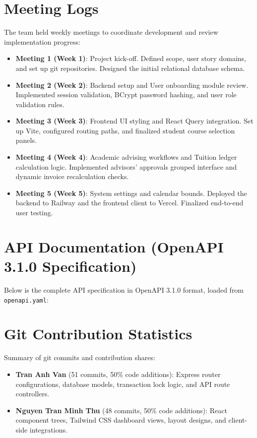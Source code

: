 \documentclass[12pt,a4paper]{report}
\begin{document}
\chapter{Meeting Logs}
The team held weekly meetings to coordinate development and review implementation progress:
\begin{itemize}
    \item \textbf{Meeting 1 (Week 1)}: Project kick-off. Defined scope, user story domains, and set up git repositories. Designed the initial relational database schema.
    \item \textbf{Meeting 2 (Week 2)}: Backend setup and User onboarding module review. Implemented session validation, BCrypt password hashing, and user role validation rules.
    \item \textbf{Meeting 3 (Week 3)}: Frontend UI styling and React Query integration. Set up Vite, configured routing paths, and finalized student course selection panels.
    \item \textbf{Meeting 4 (Week 4)}: Academic advising workflows and Tuition ledger calculation logic. Implemented advisors' approvals grouped interface and dynamic invoice recalculation checks.
    \item \textbf{Meeting 5 (Week 5)}: System settings and calendar bounds. Deployed the backend to Railway and the frontend client to Vercel. Finalized end-to-end user testing.
\end{itemize}

\chapter{API Documentation (OpenAPI 3.1.0 Specification)}
Below is the complete API specification in OpenAPI 3.1.0 format, loaded from \texttt{openapi.yaml}:



\chapter{Git Contribution Statistics}
Summary of git commits and contribution shares:
\begin{itemize}
    \item \textbf{Tran Anh Van} (51 commits, 50\% code additions): Express router configurations, database models, transaction lock logic, and API route controllers.
    \item \textbf{Nguyen Tran Minh Thu} (48 commits, 50\% code additions): React component trees, Tailwind CSS dashboard views, layout designs, and client-side integrations.
\end{itemize}
\end{document}
